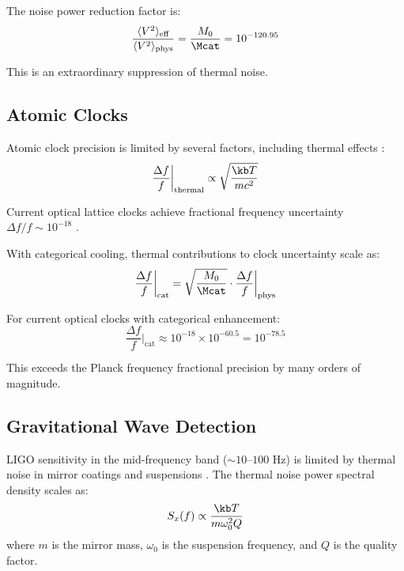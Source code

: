 The noise power reduction factor is:
\begin{equation}
\frac{\langle V^2 \rangle_{\text{eff}}}{\langle V^2 \rangle_{\text{phys}}} = \frac{M_0}{\Mcat} = 10^{-120.95}
\end{equation}

This is an extraordinary suppression of thermal noise.

\subsection{Atomic Clocks}

Atomic clock precision is limited by several factors, including thermal effects \cite{ludlow2015}:
\begin{equation}
\frac{\Delta f}{f}\bigg|_{\text{thermal}} \propto \sqrt{\frac{\kb T}{mc^2}}
\end{equation}

Current optical lattice clocks achieve fractional frequency uncertainty $\Delta f/f \sim 10^{-18}$ \cite{mcgrew2018,brewer2019}.

\begin{theorem}
\label{thm:clock_precision}
With categorical cooling, thermal contributions to clock uncertainty scale as:
\begin{equation}
\frac{\Delta f}{f}\bigg|_{\text{cat}} = \sqrt{\frac{M_0}{\Mcat}} \cdot \frac{\Delta f}{f}\bigg|_{\text{phys}}
\end{equation}
\end{theorem}

For current optical clocks with categorical enhancement:
\begin{equation}
\frac{\Delta f}{f}\bigg|_{\text{cat}} \approx 10^{-18} \times 10^{-60.5} = 10^{-78.5}
\end{equation}

This exceeds the Planck frequency fractional precision by many orders of magnitude.

\subsection{Gravitational Wave Detection}

LIGO sensitivity in the mid-frequency band ($\sim 10$--$100$ Hz) is limited by thermal noise in mirror coatings and suspensions \cite{abbott2016,adhikari2014}. The thermal noise power spectral density scales as:
\begin{equation}
S_x(f) \propto \frac{\kb T}{m \omega_0^2 Q}
\end{equation}
where $m$ is the mirror mass, $\omega_0$ is the suspension frequency, and $Q$ is the quality factor.

